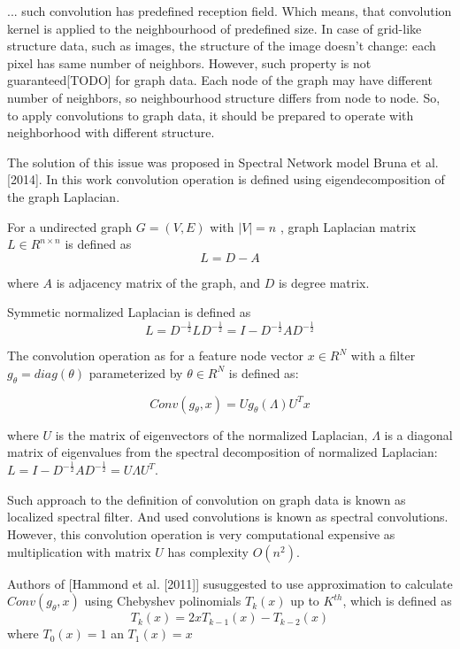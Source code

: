 ... such convolution has predefined reception field. Which means, that convolution kernel is 
applied to the neighbourhood of predefined size. In case of grid-like structure data, such as
images, the structure of the image doesn't change: each pixel has same number of neighbors. 
However, such property is not guaranteed[TODO] for graph data. Each node of the graph may have 
different number of neighbors, so neighbourhood structure differs from node to node. So,
to apply convolutions to graph data, it should be prepared to operate with neighborhood 
with different structure. %


The solution of this issue was proposed in Spectral Network model Bruna et al. [2014]. In this work
convolution operation is defined using eigendecomposition of the graph Laplacian.


For a undirected graph $G = (V,E)$ with $|V|=n$ , graph Laplacian matrix  $L \in R^{n \times n}$ is defined as 
\[L = D-A\]

where $A$ is adjacency matrix of the graph, and $D$ is degree matrix.


Symmetic normalized Laplacian is defined as 
\[L = D^{-\frac{1}{2}}LD^{-\frac{1}{2}} = I - D^{-\frac{1}{2}}AD^{-\frac{1}{2}}\]


The convolution operation  as for a feature node vector $x \in R^N$ with a
filter $g_\theta = diag(\theta)$ parameterized by $\theta \in R^N$ is defined as:

\[Conv(g_\theta,x) = Ug_\theta(\Lambda)U^{T}x\]

where $U$ is the matrix of eigenvectors of the normalized Laplacian, $\Lambda$ is a diagonal matrix of 
eigenvalues from the spectral decomposition of normalized Laplacian: $L = I - D^{-\frac{1}{2}}AD^{-\frac{1}{2}} = U\Lambda U^{T}$.

Such approach to the definition of convolution on graph data is known as localized spectral filter. And used convolutions is known as 
spectral convolutions.
However, this convolution operation is very computational expensive as multiplication with matrix $U$ has complexity $O(n^2)$.


Authors of [Hammond et al. [2011]] susuggested to use approximation to calculate $Conv(g_\theta,x)$ using Chebyshev polinomials 
$T_k(x)$ up to $K^{th}$, which is defined as 
\[
    T_k (x) = 2xT_{k-1}(x) - T_{k-2}(x)
\]
where $T_0(x)=1$ an $T_1(x)=x$

